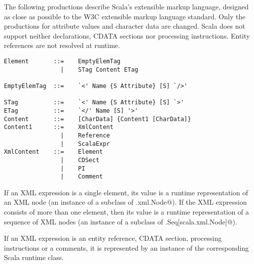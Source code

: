 The following productions describe Scala's extensible markup language,
designed as close as possible to the W3C extensible markup language
standard. Only the productions for attribute values and character data
are changed. Scala does not support neither declarations, CDATA
sections nor processing instructions. Entity references are not
resolved at runtime.

\syntax\begin{lstlisting}
Element       ::=    EmptyElemTag
                |    STag Content ETag                                       

EmptyElemTag  ::=    `<' Name {S Attribute} [S] `/>'                         

STag          ::=    `<' Name {S Attribute} [S] `>'                          
ETag          ::=    `</' Name [S] '>'                                        
Content       ::=    [CharData] {Content1 [CharData]}
Content1      ::=    XmlContent
                |    Reference
                |    ScalaExpr
XmlContent    ::=    Element
                |    CDSect
                |    PI
                |    Comment
\end{lstlisting}

If an XML expression is a single element, its value is a runtime
representation of an XML node (an instance of a subclass of 
\lstinline@scala.xml.Node@). If the XML expression consists of more
than one element, then its value is a runtime representation of a
sequence of XML nodes (an instance of a subclass of 
\lstinline@scala.Seq[scala.xml.Node]@).

If an XML expression is an entity reference, CDATA section, processing 
instructions or a comments, it is represented by an instance of the 
corresponding Scala runtime class.

